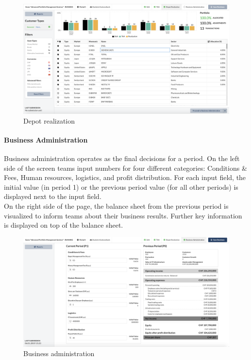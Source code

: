 \begin{figure}[h!]
  \centering
  \includegraphics[scale=0.2]{img/application-overview/teams/05_depot_realization.png}
  \caption{Depot realization}
\end{figure}

\paragraph{Business Administration}
Business administration operates as the final decisions for a period. On the left side of the screen teams input numbers for four different categories: Conditions \& Fees, Human resources, logistics, and profit distribution. For each input field, the initial value (in period 1) or the previous period value (for all other periods) is displayed next to the input field.\\

On the right side of the page, the balance sheet from the previous period is visualized to inform teams about their business results. Further key information is displayed on top of the balance sheet.
\begin{figure}[h!]
  \centering
  \includegraphics[scale=0.2]{img/application-overview/teams/06_business.png}
  \caption{Business administration}
\end{figure}


